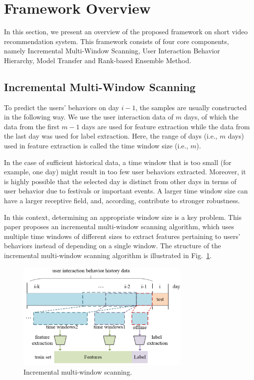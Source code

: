 \documentclass{article}
\begin{document}

\section{Framework Overview}
\label{sec:framework-overview}

In this section, we present an overview of the proposed framework on short video recommendation system. This framework consists of four core components, namely Incremental Multi-Window Scanning, User Interaction Behavior Hierarchy, Model Transfer and Rank-based Ensemble Method.

\subsection{Incremental Multi-Window Scanning}
\label{sec:incremental-multi-window-scanning}

To predict the users’ behaviors on day $i-1$, the samples are usually constructed in the following way. We use the user interaction data of $m$ days, of which the data from the first $m-1$ days are used for feature extraction while the data from the last day was used for label extraction. Here, the range of days (i.e., $m$ days) used in feature extraction is called the time window size (i.e., $m$).

In the case of sufficient historical data, a time window that is too small (for example, one day) might result in too few user behaviors extracted. Moreover, it is highly possible that the selected day is distinct from other days in terms of user behavior due to festivals or important events. A larger time window size can have a larger receptive field, and, according, contribute to stronger robustness.

In this context, determining an appropriate window size is a key problem. This paper proposes an incremental multi-window scanning algorithm, which uses multiple time windows of different sizes to extract features pertaining to users’ behaviors instead of depending on a single window. The structure of the incremental multi-window scanning algorithm is illustrated in Fig.~\ref{fig:incre-multi-window-scan}.

\begin{figure}
  \centering
  \includegraphics[width=8.5cm]{media/incre-multi-window-scan}
  \caption{Incremental multi-window scanning.}
  \label{fig:incre-multi-window-scan}
\end{figure}
\end{document}
